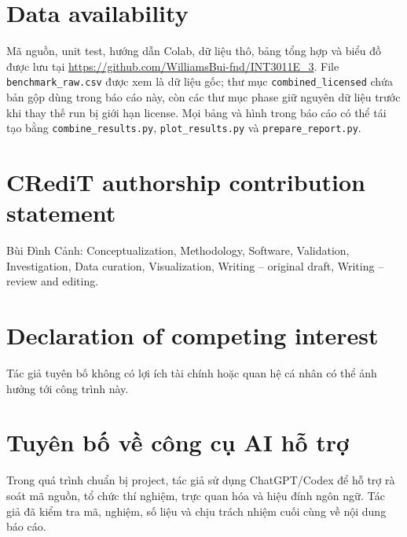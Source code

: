 \documentclass[a4paper,fleqn]{cas-sc}
\providecommand{\ReportPrefix}{}
\newcommand{\RepositoryURL}{https://github.com/WilliamsBui-fnd/INT3011E_3}
\begin{document}
\section*{Data availability}

Mã nguồn, unit test, hướng dẫn Colab, dữ liệu thô, bảng tổng hợp và biểu đồ được
lưu tại \url{\RepositoryURL}. File \texttt{benchmark\_raw.csv} được xem là dữ
liệu gốc; thư mục \texttt{combined\_licensed} chứa bản gộp dùng trong báo cáo
này, còn các thư mục phase giữ nguyên dữ liệu trước khi thay thế run bị
giới hạn license. Mọi bảng và hình trong báo cáo có thể tái tạo bằng
\texttt{combine\_results.py}, \texttt{plot\_results.py} và
\texttt{prepare\_report.py}.

\section*{CRediT authorship contribution statement}

Bùi Đình Cảnh: Conceptualization, Methodology, Software, Validation,
Investigation, Data curation, Visualization, Writing -- original draft,
Writing -- review and editing.

\section*{Declaration of competing interest}

Tác giả tuyên bố không có lợi ích tài chính hoặc quan hệ cá nhân có thể
ảnh hưởng tới công trình này.

\section*{Tuyên bố về công cụ AI hỗ trợ}

Trong quá trình chuẩn bị project, tác giả sử dụng ChatGPT/Codex để hỗ trợ rà
soát mã nguồn, tổ chức thí nghiệm, trực quan hóa và hiệu đính ngôn ngữ. Tác giả
đã kiểm tra mã, nghiệm, số liệu và chịu trách nhiệm cuối cùng về nội dung báo
cáo.




\ifdefined\FullReport
\appendix

\fi
\end{document}
